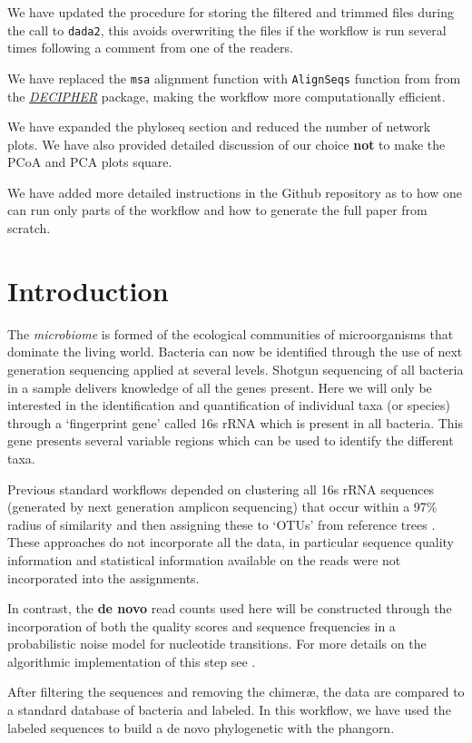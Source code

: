 \documentclass[9pt,a4paper]{extarticle}\usepackage[]{graphicx}\usepackage[]{color}
\makeatletter
\newcommand{\pkgname}[1]{\textit{#1}\xspace}
\newcommand{\CRANurl}[1]{\url{http://cran.r-project.org/package=#1}}
\def\CRANpkg{\@ifstar\@CRANpkg\@@CRANpkg}
\def\@CRANpkg#1{\href{http://cran.r-project.org/package=#1}{\pkgname{#1}}}
\def\@@CRANpkg#1{\href{http://cran.r-project.org/package=#1}{\pkgname{#1}}} %
\newcommand{\BioCpkg}[1]{\href{http://www.bioconductor.org/packages/release/bioc/html/#1.html}{\pkgname{#1}}}
\makeatother
\begin{document}
We have updated the procedure for storing the
filtered and trimmed files during the call to {\tt dada2}, this avoids overwriting
the files if the workflow is run several times following a comment from one of the readers.

We have replaced the {\tt msa} alignment function with {\tt AlignSeqs} function from
from the \BioCpkg{DECIPHER}\citep{DECIPHER} package, making the workflow
more computationally efficient.

We have expanded the phyloseq section and reduced the number of network plots.
We have also
provided detailed discussion of our choice {\bf not} to make the PCoA and PCA plots square.

We have added more detailed instructions in the Github repository as to how one can run only parts
of the workflow and how to generate the full paper from scratch.
\section*{Introduction}
The {\em microbiome} is formed of the ecological communities of
microorganisms that dominate the living world. Bacteria can now be
identified through the use of next generation sequencing applied at
several levels.  Shotgun sequencing of all bacteria in a sample
delivers knowledge of all the genes present. Here we will only be
interested in the identification and quantification of individual taxa
(or species) through a `fingerprint gene' called 16s rRNA which is
present in all bacteria. This gene presents several variable regions
which can be used to identify the different taxa.

Previous standard workflows depended on clustering all 16s rRNA
sequences (generated by next generation amplicon sequencing)
that occur within a 97\% radius of similarity and then
assigning these to `OTUs' from reference trees
\cite{caporaso2010qiime,mothur}. These approaches do not
incorporate all the data, in particular sequence quality information and statistical information
available on the reads were not incorporated into the assignments.

In contrast, the {\bf de novo} read counts used here will be
constructed through the incorporation of both the quality scores and sequence frequencies in
a probabilistic  noise model for nucleotide transitions. For more details
on the algorithmic  implementation of this
step see \cite{dada2}.

After filtering the sequences and removing the chimer\ae, the data
are compared to a standard database of bacteria and labeled.
In this workflow, we have used
the labeled sequences to build a de novo phylogenetic with the
\CRANpkg{phangorn}.
\end{document}
